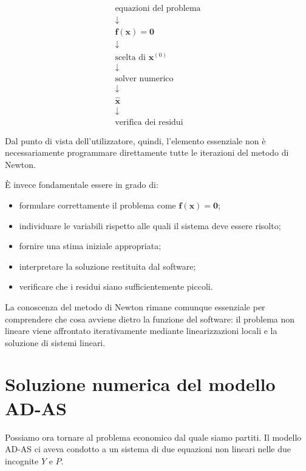 \begin{equation*}
\boxed{
\begin{array}{c}
\text{equazioni del problema}\\
\downarrow\\
\mathbf{f}(\mathbf{x})=\mathbf{0}\\
\downarrow\\
\text{scelta di }\mathbf{x}^{(0)}\\
\downarrow\\
\text{solver numerico}\\
\downarrow\\
\widehat{\mathbf{x}}\\
\downarrow\\
\text{verifica dei residui}
\end{array}}
\end{equation*}

Dal punto di vista dell'utilizzatore, quindi, l'elemento essenziale
non è necessariamente programmare direttamente tutte le iterazioni
del metodo di Newton.

È invece fondamentale essere in grado di:

\begin{itemize}
    \item formulare correttamente il problema come
          $\mathbf{f}(\mathbf{x})=\mathbf{0}$;
    \item individuare le variabili rispetto alle quali il sistema
          deve essere risolto;
    \item fornire una stima iniziale appropriata;
    \item interpretare la soluzione restituita dal software;
    \item verificare che i residui siano sufficientemente piccoli.
\end{itemize}

La conoscenza del metodo di Newton rimane comunque essenziale per
comprendere che cosa avviene dietro la funzione del software:
il problema non lineare viene affrontato iterativamente mediante
linearizzazioni locali e la soluzione di sistemi lineari.

\section{Soluzione numerica del modello AD-AS}
\label{sec:soluzione-adas}

Possiamo ora tornare al problema economico dal quale siamo partiti.
Il modello AD-AS ci aveva condotto a un sistema di due equazioni
non lineari nelle due incognite $Y$ e $P$.

